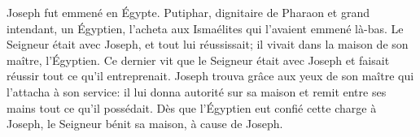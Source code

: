 Joseph fut emmené en Égypte.
Putiphar, dignitaire de Pharaon et grand intendant, un Égyptien,
	l’acheta aux Ismaélites qui l’avaient emmené là-bas.
Le Seigneur était avec Joseph, et tout lui réussissait;
	il vivait dans la maison de son maître, l’Égyptien.
Ce dernier vit que le Seigneur était avec Joseph
	et faisait réussir tout ce qu’il entreprenait.
Joseph trouva grâce aux yeux de son maître qui l’attacha à son service:
	il lui donna autorité sur sa maison et remit entre ses mains tout ce qu’il possédait.
Dès que l’Égyptien eut confié cette charge à Joseph,
	le Seigneur bénit sa maison, à cause de Joseph.
